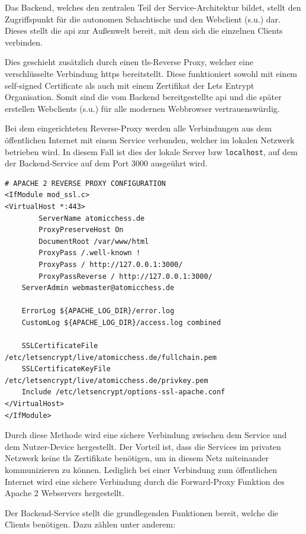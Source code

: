 Das Backend, welches den zentralen Teil der Service-Architektur bildet,
stellt den Zugriffspunkt für die autonomen Schachtische und den
Webclient (s.u.) dar. Dieses stellt die \gls{api} zur Außenwelt bereit,
mit dem sich die einzelnen Clients verbinden.

Dies geschieht zusätzlich durch einen \gls{tls}-Reverse Proxy, welcher
eine verschlüsselte Verbindung \gls{https} bereitstellt. Diese
funktioniert sowohl mit einem self-signed Certificate als auch mit einem
Zertifikat der Lets Entrypt Organisation\cite{letsencrpyt}. Somit
sind die vom Backend bereitgestellte \gls{api} und die später erstellen
Webclients (s.u.) für alle modernen Webbrowser vertrauenswürdig.

Bei dem eingerichteten Reverse-Proxy werden alle Verbindungen aus dem
öffentlichen Internet mit einem Service verbunden, welcher im lokalen
Netzwerk betrieben wird. In diesem Fall ist dies der lokale Server bzw
\passthrough{\lstinline!localhost!}, auf dem der Backend-Service auf dem
Port 3000 ausgeührt wird.

\begin{lstlisting}
# APACHE 2 REVERSE PROXY CONFIGURATION
<IfModule mod_ssl.c>
<VirtualHost *:443>
        ServerName atomicchess.de
        ProxyPreserveHost On 
        DocumentRoot /var/www/html
        ProxyPass /.well-known !
        ProxyPass / http://127.0.0.1:3000/
        ProxyPassReverse / http://127.0.0.1:3000/   
    ServerAdmin webmaster@atomicchess.de

    ErrorLog ${APACHE_LOG_DIR}/error.log
    CustomLog ${APACHE_LOG_DIR}/access.log combined

    SSLCertificateFile /etc/letsencrypt/live/atomicchess.de/fullchain.pem
    SSLCertificateKeyFile /etc/letsencrypt/live/atomicchess.de/privkey.pem
    Include /etc/letsencrypt/options-ssl-apache.conf
</VirtualHost>
</IfModule>
\end{lstlisting}

Durch diese Methode wird eine sichere Verbindung zwischen dem Service
und dem Nutzer-Device hergestellt. Der Vorteil ist, dass die Services im
privaten Netzwerk keine \gls{tls} Zertifikate benötigen, um in diesem
Netz miteinander kommunizieren zu können. Lediglich bei einer Verbindung
zum öffentlichen Internet wird eine sichere Verbindung durch die
Forward-Proxy Funktion des Apache 2 Webservers hergestellt.

Der Backend-Service stellt die grundlegenden Funktionen bereit, welche
die Clients benötigen. Dazu zählen unter anderem:

